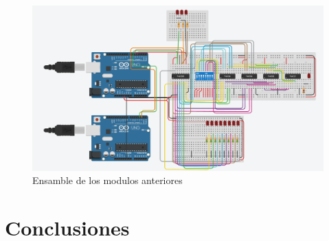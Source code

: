 \documentclass{article}
\begin{document}
\begin{figure}[!ht] 
\includegraphics[width=12cm]{esquemaEnsamble.PNG}
\centering
\caption{Ensamble de los modulos anteriores}
\end{figure}



\section{Conclusiones} \label{conclusiones}



\end{document}
